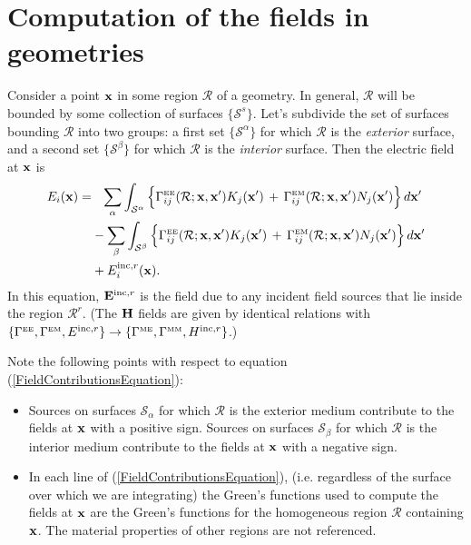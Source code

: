 \newpage
\section{Computation of the fields in \lss geometries}

Consider a point $\mathbf{x}$ in some region $\mathcal{R}$
of a \lss geometry. In general, $\mathcal{R}$
will be bounded by some collection of surfaces
$\{\mathcal{S}^s\}$. Let's subdivide the set of 
surfaces bounding $\mathcal{R}$ into two groups:
a first set $\{\mathcal{S}^\alpha\}$ for which
$\mathcal{R}$ is the \textit{exterior} surface,
and a second set $\{\mathcal{S}^\beta\}$ for which
$\mathcal{R}$ is the \textit{interior} surface.
Then the electric field at $\mathbf{x}$ is
\begin{align} 
E_i(\mathbf{x}) 
    = &\hphantom{-} \sum_\alpha \int_{\mathcal{S}^\alpha} 
           \Big\{ \Gamma_{ij}^{\hbox{\tiny{EE}}}(\mathcal{R}; \mathbf{x}, \mathbf{x}^\prime) 
                   K_j(\mathbf{x}^\prime)
                  \,+\,
                   \Gamma_{ij}^{\hbox{\tiny{EM}}}(\mathcal{R}; \mathbf{x}, \mathbf{x}^\prime) 
                   N_j(\mathbf{x}^\prime)
           \Big\} \, d\mathbf{x}^\prime
\nonumber \\
     &-\sum_\beta \int_{\mathcal{S}^\beta} 
           \Big\{ \Gamma_{ij}^{\hbox{\tiny{EE}}}(\mathcal{R}; \mathbf{x}, \mathbf{x}^\prime) 
                   K_j(\mathbf{x}^\prime)
                  \,+\,
                   \Gamma_{ij}^{\hbox{\tiny{EM}}}(\mathcal{R}; \mathbf{x}, \mathbf{x}^\prime) 
                   N_j(\mathbf{x}^\prime)
           \Big\} \, d\mathbf{x}^\prime
\nonumber \\
     &+E^{\text{\scriptsize inc},r}_i(\mathbf{x}).
\label{FieldContributionsEquation}
\end{align}
In this equation, $\mathbf{E}^{\text{\scriptsize inc},r}$ is the field due to any 
incident field sources that lie inside the region $\mathcal{R}^r.$
(The $\mathbf{H}$ fields are given by identical relations with 
$\{ \Gamma^{\hbox{\tiny{EE}}}, \Gamma^{\hbox{\tiny{EM}}}, E^{\text{\scriptsize inc},r}\} \to 
 \{ \Gamma^{\hbox{\tiny{ME}}}, \Gamma^{\hbox{\tiny{MM}}}, H^{\text{\scriptsize inc},r}\}$.)

Note the following points with respect to equation
(\ref{FieldContributionsEquation}):
\begin{itemize}
  \item Sources on surfaces $\mathcal{S}_\alpha$ for which
        $\mathcal{R}$ is the exterior medium  
        contribute to the fields at $\mathbf{x}$ 
        with a positive sign.
        Sources on surfaces $\mathcal{S}_\beta$ for which
        $\mathcal{R}$ is the interior medium  
        contribute to the fields at $\mathbf{x}$ 
        with a negative sign.

  \item In each line of (\ref{FieldContributionsEquation}), 
        (i.e. regardless of the surface over which we are 
        integrating) the Green's functions used to compute
        the fields at $\mathbf{x}$ are the Green's functions for
        the homogeneous region $\mathcal{R}$ containing $\mathbf{x}$.
        The material properties of other regions are not
        referenced.
\end{itemize}

